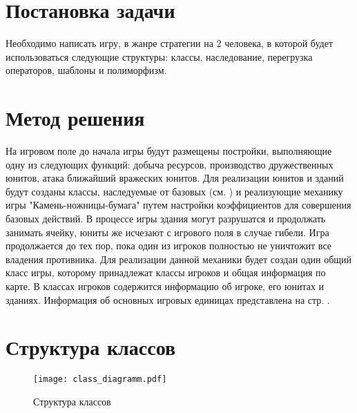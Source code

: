 \documentclass[a4paper,14pt]{article}
\begin{document}


\section{Постановка задачи}

Необходимо написать игру, в жанре стратегии на 2 человека, в которой будет использоваться следующие структуры: классы, наследование, перегрузка операторов, шаблоны и полиморфизм. 

\section{Метод решения}

На игровом поле до начала игры будут размещены постройки, выполняющие одну из следующих функций: добыча ресурсов, производство дружественных юнитов, атака ближайший вражеских юнитов. Для реализации юнитов и зданий будут созданы классы, наследуемые от базовых (см. ) и реализующие механику игры "Камень-ножницы-бумага" путем настройки коэффициентов для совершения базовых действий. В процессе игры здания могут разрушатся и продолжать занимать ячейку, юниты же исчезают с игрового поля в случае гибели. Игра продолжается до тех пор, пока один из игроков полностью не уничтожит все владения противника.
Для реализации данной механики будет создан один общий класс игры, которому принадлежат классы игроков и общая информация по карте. В классах игроков содержится информацию об игроке, его юнитах и зданиях. Информация об основных игровых единицах представлена на стр. \pageref{im:UML}.

\section{Структура классов}

\begin{figure}[H]
	\centering
	\caption{Структура классов}
	\texttt{[image: class\_diagramm.pdf]}	
	\label{im:UML}
\end{figure}
\end{document}
